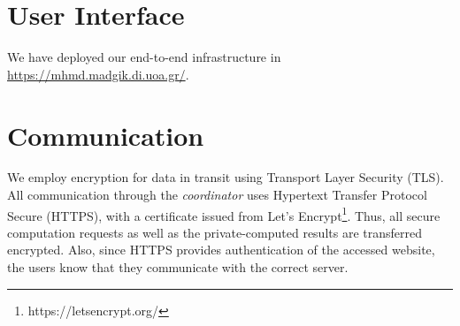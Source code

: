 
\section{User Interface}\label{s:impl-ui}

We have deployed our end\hyp to\hyp end infrastructure in \href{https://mhmd.madgik.di.uoa.gr/}{https://mhmd.madgik.di.uoa.gr/}.





\section{Communication}\label{s:impl-communication}
We employ encryption for data in transit using Transport Layer Security (TLS).
All communication through the \textit{coordinator} uses Hypertext Transfer Protocol Secure (HTTPS), with a certificate issued from Let's Encrypt\footnote{https://letsencrypt.org/}.
Thus, all secure computation requests as well as the private\hyp computed results are transferred encrypted.
Also, since HTTPS provides authentication of the accessed website, the users know that they communicate with the correct server.





